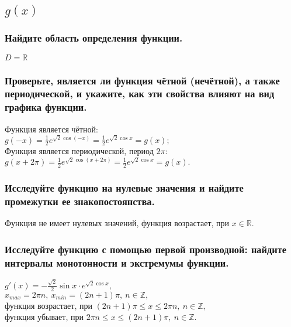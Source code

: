 \documentclass[a4paper,12pt]{article}
\begin{document}

\subsection{$g(x)$}

\subsubsection{Найдите область определения функции.}

$D=\mathbb{R}$

\subsubsection{Проверьте, является ли функция чётной (нечётной), а также периодической, и укажите, как эти свойства влияют на вид графика функции.}

Функция является чётной:\\
$g(-x)=\frac12e^{\sqrt2\cos(-x)}=\frac12e^{\sqrt2\cos x}=g(x);$\\
Функция является периодической, период $2\pi$:\\
$g(x+2\pi)=\frac12e^{\sqrt2\cos(x+2\pi)}=
\frac12e^{\sqrt2\cos x}=g(x).$

\subsubsection{Исследуйте функцию на нулевые значения и найдите промежутки ее знакопостоянства.}

Функция не имеет нулевых значений, функция возрастает, при $x\in\mathbb{R}$.

\subsubsection{Исследуйте функцию с помощью первой производной: найдите интервалы монотонности и экстремумы функции.}

$g'(x)=-\frac{\sqrt2}{2}\sin x\cdot e^{\sqrt2\cos x},$\\
$x_{max}=2\pi n,\ x_{min}=(2n+1)\pi,\ n\in\mathbb{Z},$\\
функция возрастает, при $(2n+1)\pi\leq x\leq2\pi n,\ 
	n\in\mathbb{Z},$\\
функция убывает, при $2\pi n\leq x\leq(2n+1)\pi,\ n\in\mathbb{Z}.$
\end{document}

